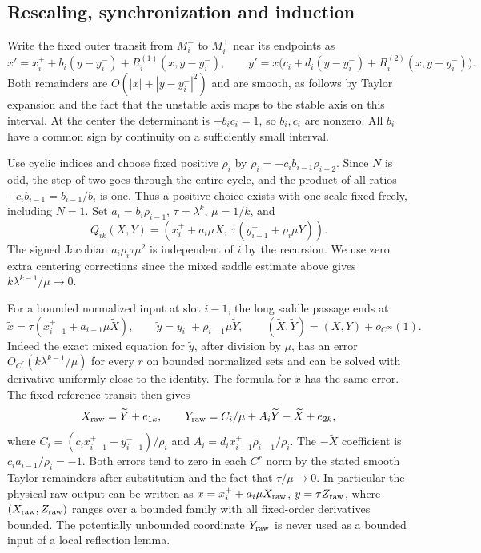 \documentclass[11pt]{article}
\begin{document}
\subsection{Rescaling, synchronization and
induction}\label{rescaling-synchronization-and-induction}

Write the fixed outer transit from \(M_i^-\) to \(M_i^+\) near its endpoints as
\[
 x'=x_i^++b_i(y-y_i^-)+R_i^{(1)}(x,y-y_i^-),\qquad
 y'=x\big(c_i+d_i(y-y_i^-)+R_i^{(2)}(x,y-y_i^-)\big).
\] Both remainders are \(O(|x|+|y-y_i^-|^2)\) and are smooth, as follows by
Taylor expansion and the fact that the unstable axis maps to the stable axis on
this interval. At the center the determinant is \(-b_ic_i=1\), so \(b_i,c_i\)
are nonzero. All \(b_i\) have a common sign by continuity on a sufficiently
small interval.

Use cyclic indices and choose fixed positive \(\rho_i\) by
\(\rho_i=-c_i b_{i-1}\rho_{i-2}\). Since \(N\) is odd, the step of two goes
through the entire cycle, and the product of all ratios
\(-c_i b_{i-1}=b_{i-1}/b_i\) is one. Thus a positive choice exists with one
scale fixed freely, including \(N=1\). Set \(a_i=b_i\rho_{i-1}\),
\(\tau=\lambda^k\), \(\mu=1/k\), and \[
 Q_{ik}(X,Y)=(x_i^++a_i\mu X,\ \tau(y^-_{i+1}+\rho_i\mu Y)).
\] The signed Jacobian \(a_i\rho_i\tau\mu^2\) is independent of \(i\) by the
recursion. We use zero extra centering corrections since the mixed saddle
estimate above gives \(k\lambda^{k-1}/\mu\to0\).

For a bounded normalized input at slot \(i-1\), the long saddle passage ends at
\[
 \tilde x=\tau(x_{i-1}^++a_{i-1}\mu\widetilde X),\qquad
 \tilde y=y_i^-+\rho_{i-1}\mu\widetilde Y,
 \qquad (\widetilde X,\widetilde Y)=(X,Y)+o_{C^\infty}(1).
\] Indeed the exact mixed equation for \(\tilde y\), after division by \(\mu\),
has an error \(O_{C^r}(k\lambda^{k-1}/\mu)\) for every \(r\) on bounded
normalized sets and can be solved with derivative uniformly close to the
identity. The formula for \(\tilde x\) has the same error. The fixed reference
transit then gives \[
 X_{\rm raw}=\widetilde Y+e_{1k},\qquad
 Y_{\rm raw}=C_i/\mu+A_i\widetilde Y-\widetilde X+e_{2k},
\] where \(C_i=(c_i x_{i-1}^+-y_{i+1}^-)/\rho_i\) and
\(A_i=d_i x_{i-1}^+\rho_{i-1}/\rho_i\). The \(-\widetilde X\) coefficient is
\(c_i a_{i-1}/\rho_i=-1\). Both errors tend to zero in each \(C^r\) norm by the
stated smooth Taylor remainders after substitution and the fact that
\(\tau/\mu\to0\). In particular the physical raw output can be written as
\(x=x_i^++a_i\mu X_{\rm raw}\), \(y=\tau Z_{\rm raw}\), where
\((X_{\rm raw},Z_{\rm raw})\) ranges over a bounded family with all fixed-order
derivatives bounded. The potentially unbounded coordinate \(Y_{\rm raw}\) is
never used as a bounded input of a local reflection lemma.
\end{document}
